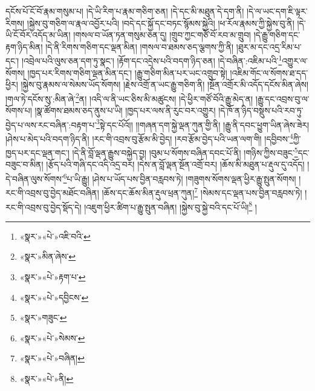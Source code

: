 དངོས་པོ་ངོ་བོ་རྣམ་གསུམ་པ། །དེ་ཡི་རིག་པ་རྣམ་གཅིག་ཅན། །དེ་དང་མི་མཐུན་དེ་དག་ནི། །དེ་ལ་ཡང་དག་ཇི་ལྟར་རིགས། །སྐྱེས་བུ་གཅིག་ལ་རྣལ་འབྱོར་པའི། །བདེ་དང་སྐྱོ་དང་བཏང་སྙོམས་སྐྱེའི། །ཕ་རོལ་རྣམས་ཀྱི་སྐྱེས་བུ་ནི། །དེ་ཡི་ངོ་བོར་འདོད་མ་ཡིན། །གསལ་བ་ཡོན་ཏན་གསུམ་ཅན་དུ། །གྲུབ་ཀྱང་གཙོ་བོ་རབ་མ་གྲུབ། །དེ་རྒྱུ་གཅིག་དང་རྟག་ཉིད་མིན། །དེ་ནི་རིགས་གཅིག་དང་ལྡན་མིན། །གསལ་བ་ཐམས་ཅད་ལྕགས་ཀྱི་ནི། །ཐུར་མ་དང་འདྲ་རིམ་པ་དང་། །འབྲེལ་པའི་ལུས་ཅན་དག་ཏུ་སྣང་། །རྟོག་དང་འདྲེས་པའི་བདག་ཉིད་ཅན། །དེ་བཞིན་:འཇིམ་པའི་\footnote{«སྣར་»«པེ་»འཇི་བའི་}འགྱུར་ལ་སོགས། །ཁྱད་པར་རིགས་གཅིག་ལྡན་མིན་དང་། །རྒྱུ་གཅིག་མིན་པར་ཡང་འགྲུབ་སྟེ། །འཇིམ་གོང་ལ་སོགས་ཐ་དད་ཕྱིར། །སྐྱེས་བུ་རྣམས་ལ་སེམས་ཡོད་སོགས། །རྗེས་འགྲོ་ན་ཡང་རྒྱུ་གཅིག་ནི། །སྔོན་འགྲོར་མི་འདོད་དངོས་མིན་ཞེས། །གལ་ཏེ་དངོས་སུ་:མིན་ཞེ་\footnote{«སྣར་»མིན་ཞེས་}ན། །འདི་ལ་ནི་ཡང་ཅིས་མི་མཚུངས། །དེ་ཕྱིར་གཙོ་བོའི་རྒྱུ་མེད་ན། །རྒྱུ་དང་འབྲས་བུ་ལ་སོགས་པ། །སྣ་ཚོགས་ཐམས་ཅད་ནུས་པ་ཡི། །ཁྱད་པར་ལས་ནི་རུང་བར་འགྱུར། །དེ་ཁོ་ན་ཉིད་བསྡུས་པའི་རབ་ཏུ་བྱེད་པ་ལས་རང་བཞིན་:བརྟག་པ་\footnote{«སྣར་»«པེ་»རྟག་པ་}སྟེ་དང་པོའོ།། །།གཞན་དག་སྐྱེ་ལྡན་ཀུན་གྱི་ནི། །རྒྱུ་ནི་དབང་ཕྱུག་ཡིན་ཞེས་ཟེར། །ཤེས་པ་མེད་པའི་བདག་ཉིད་ནི། །རང་གི་འབྲས་བུ་རྩོམ་མི་བྱེད། །རབ་རྩོམ་བྱེད་པའི་ཡན་ལག་གི། །དབྱིབས་\footnote{«སྣར་»«པེ་»དབྱིངས་}ཀྱི་ཁྱད་པར་དང་ལྡན་གང་། །དེ་ནི་བློ་ལྡན་རྒྱུས་བསྐྱེད་བྱ། །བུམ་པ་སོགས་བཞིན་དབང་པོ་ནི། །གཉིས་ཀྱིས་བཟུང་\footnote{«སྣར་»གཟུང་}དང་བཟུང་བ་མིན། །རྩོད་པའི་གཞི་དང་འདི་འདྲ་བར། །དེས་ན་བློ་ལྡན་སྔོན་འགྲོ་བར། །ཆོས་མི་མཐུན་པ་རྡུལ་དུ་འདོད། །དེ་བཞིན་ལུས་སོགས་\footnote{«སྣར་»«པེ་»སེམས་}པ་ཡི་རྒྱུ། །ཤེས་པ་ཡོད་པས་བྱིན་བརླབས་ཏེ། །གཟུགས་སོགས་ལྡན་ཕྱིར་རྒྱུ་སྤུན་སོགས། །རང་གི་འབྲས་བུ་བྱེད་མཐོང་བཞིན། །ཆོས་དང་ཆོས་མིན་རྡུལ་ཕྲན་ཀུན།\footnote{«སྣར་»«པེ་»བཞིན།} །སེམས་དང་ལྡན་པས་བྱིན་བརླབས་ཏེ། །རང་གི་འབྲས་བུ་བྱེད་སྡོད་དེ། །འཇུག་ཕྱིར་ཚིག་པ་རྒྱུ་སྤུན་བཞིན། །སྐྱེས་བུ་སྐྱེ་བའི་དང་པོ་ཡི།\footnote{«སྣར་»«པེ་»ནི།} །
